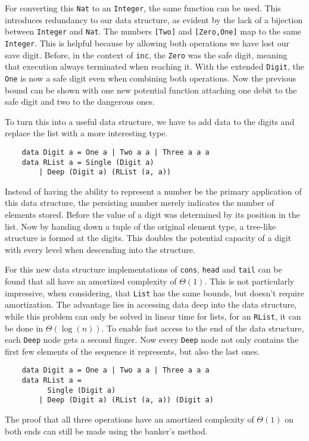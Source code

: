 For converting this \texttt{Nat} to an \texttt{Integer}, the same function can be used. This introduces redundancy to our data structure, as evident by the lack of a bijection between \texttt{Integer} and \texttt{Nat}. The numbers \texttt{[Two]} and \texttt{[Zero,One]} map to the same \texttt{Integer}. This is helpful because by allowing both operations we have lost our save digit. Before, in the context of \texttt{inc}, the \texttt{Zero} was the safe digit, meaning that execution always terminated when reaching it. With the extended \texttt{Digit}, the \texttt{One} is now a safe digit even when combining both operations. Now the previous bound can be shown with one new potential function attaching one debit to the safe digit and two to the dangerous ones.\par
To turn this into a useful data structure, we have to add data to the digits and replace the list with a more interesting type.
\begin{verbatim}
    data Digit a = One a | Two a a | Three a a a
    data RList a = Single (Digit a) 
        | Deep (Digit a) (RList (a, a))
\end{verbatim}
Instead of having the ability to represent a number be the primary application of this data structure, the persisting number merely indicates the number of elements stored. Before the value of a digit was determined by its position in the list. Now by handing down a tuple of the original element type, a tree-like structure is formed at the digits. This doubles the potential capacity of a digit with every level when descending into the structure.\par
For this new data structure implementations of \texttt{cons}, \texttt{head} and \texttt{tail} can be found that all have an amortized complexity of \(\Theta(1)\). This is not particularly impressive, when considering, that \texttt{List} has the same bounds, but doesn't require amortization. The advantage lies in accessing data deep into the data structure, while this problem can only be solved in linear time for lists, for an \texttt{RList}, it can be done in \(\Theta(\log (n))\). To enable fast access to the end of the data structure, each \texttt{Deep} node gets a second finger. Now every \texttt{Deep} node not only contains the first few elements of the sequence it represents, but also the last ones.
\begin{verbatim}
    data Digit a = One a | Two a a | Three a a a
    data RList a =
          Single (Digit a)
        | Deep (Digit a) (RList (a, a)) (Digit a) 
\end{verbatim}
The proof that all three operations have an amortized complexity of \(\Theta(1)\) on both ends can still be made using the banker's method.

